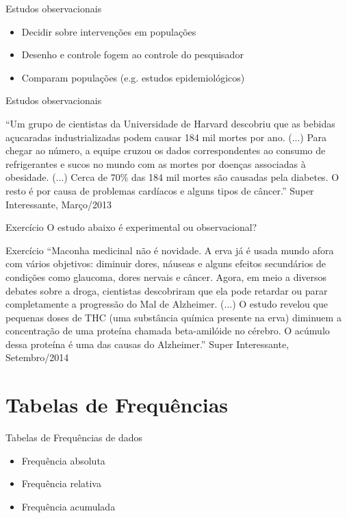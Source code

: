 \documentclass{beamer}
\begin{document}
\begin{frame}{Estudos observacionais}
  \begin{itemize}
  \item Decidir sobre intervenções em populações
  \item Desenho e controle fogem ao controle do pesquisador
 \item Comparam populações (e.g. estudos epidemiológicos)
  \end{itemize}
\end{frame}

\begin{frame}{Estudos observacionais}
  \begin{example}
    ``Um grupo de cientistas da Universidade de Harvard descobriu que
    as bebidas açucaradas industrializadas podem causar 184 mil mortes
    por ano.  (...) Para chegar ao número, a equipe cruzou os dados
    correspondentes ao consumo de refrigerantes e sucos no mundo com
    as mortes por doenças associadas à obesidade. (...) Cerca de 70\%
    das 184 mil mortes são causadas pela \alert{diabetes}. O resto é
    por causa de problemas cardíacos e alguns tipos de câncer.'' Super
    Interessante, Março/2013

  \end{example}
\end{frame}

\begin{frame}{Exercício}
  O estudo abaixo é experimental ou observacional?
  
  \begin{block}{Exercício}
    ``Maconha medicinal não é novidade. A erva já é usada mundo afora
    com vários objetivos: diminuir dores, náuseas e alguns efeitos
    secundários de condições como glaucoma, dores nervais e
    câncer. Agora, em meio a diversos debates sobre a droga,
    cientistas descobriram que ela pode retardar ou parar
    completamente a progressão do Mal de Alzheimer. (...)  O estudo
    revelou que pequenas doses de THC (uma substância química presente
    na erva) diminuem a concentração de uma proteína chamada
    beta-amilóide no cérebro. O acúmulo dessa proteína é uma das
    causas do Alzheimer.'' Super Interessante, Setembro/2014
  \end{block}
\end{frame}

\section{Tabelas de Frequências}
\begin{frame}{Tabelas de Frequências de dados}
  \begin{itemize}
  \item Frequência absoluta
  \item Frequência relativa
  \item Frequência acumulada
  \end{itemize}
\end{frame}
\end{document}
